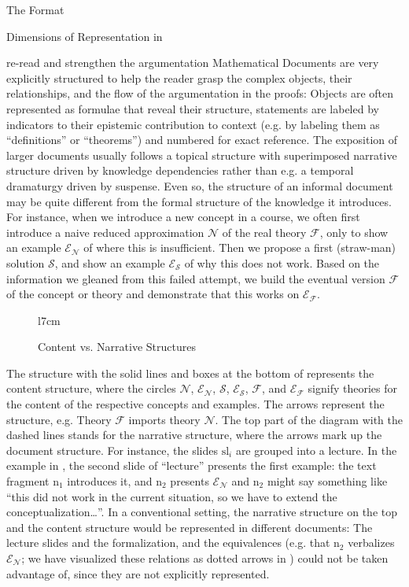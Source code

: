 \begin{omgroup}[creators=miko,id=spec-intro]{The \omdoc Format}
\begin{omgroup}[id=syntax-semantics]{Dimensions of Representation in \omdoc}
\begin{newpart}{re-read and strengthen the argumentation}
Mathematical Documents are very explicitly structured to help the reader grasp the complex
objects, their relationships, and the flow of the argumentation in the proofs: Objects are
often represented as formulae that reveal their structure, statements are labeled by
indicators to their epistemic contribution to context (e.g. by labeling them as
``definitions'' or ``theorems'') and numbered for exact reference. The exposition of
larger documents usually follows a topical structure with superimposed narrative structure
driven by knowledge dependencies rather than e.g. a temporal dramaturgy driven by
suspense.  Even so, the structure of an informal document may be quite different from the
formal structure of the knowledge it introduces. For instance, when we introduce a new
concept in a course, we often first introduce a naive reduced approximation $\mathcal{N}$
of the real theory $\mathcal{F}$, only to show an example $\mathcal{E_N}$ of where this is
insufficient. Then we propose a first (straw-man) solution $\mathcal{S}$, and show an
example $\mathcal{E_S}$ of why this does not work. Based on the information we gleaned
from this failed attempt, we build the eventual version $\mathcal{F}$ of the concept or
theory and demonstrate that this works on $\mathcal{E_F}$.

\begin{figure}l{7cm}
\caption{Content vs. Narrative Structures}\label{fig:straw-man}
\end{figure}
The structure with the solid lines and boxes at the bottom of {}
represents the content structure, where the circles $\mathcal{N}$, $\mathcal{E_N}$,
$\mathcal{S}$, $\mathcal{E_S}$, $\mathcal{F}$, and $\mathcal{E_F}$ signify theories for
the content of the respective concepts and examples. The arrows represent the
{} structure, e.g. Theory $\mathcal{F}$ imports theory
$\mathcal{N}$. The top part of the diagram with the dashed lines stands for the narrative
structure, where the arrows mark up the document structure. For instance, the slides
$\text{sl}_i$ are grouped into a lecture. In the example in {}, the
second slide of ``lecture'' presents the first example: the text fragment $\text{n}_1$
introduces it, and $\text{n}_2$ presents $\mathcal{E_N}$ and $\text{n}_2$ might say
something like ``this did not work in the current situation, so we have to extend the
conceptualization\ldots''. In a conventional setting, the narrative structure on the top
and the content structure would be represented in different documents: The lecture slides
and the formalization, and the equivalences (e.g. that $\text{n}_2$ verbalizes
$\mathcal{E_N}$; we have visualized these relations as dotted arrows in
{}) could not be taken advantage of, since they are not explicitly
represented.


\end{newpart}
\end{omgroup}
\end{omgroup}

